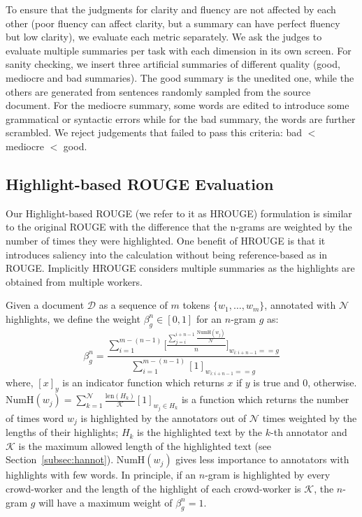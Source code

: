 \documentclass[11pt,a4paper]{article}
\newcommand\hrouge{\textsc{HROUGE}}
\newcommand\rouge{\textsc{ROUGE}}
\begin{document}
To ensure that the judgments for clarity and fluency are not affected by each other (poor fluency can affect clarity, but a summary can have perfect fluency but low clarity), we evaluate each metric separately. We ask the judges to evaluate multiple summaries per task with each dimension in its own screen. For sanity checking, we insert three artificial summaries of different quality (good, mediocre and bad summaries). The good summary is the unedited one, while the others are generated from sentences randomly sampled from the source document. For the mediocre summary, some words are edited to introduce some grammatical or syntactic errors while for the bad summary, the words are further scrambled. We reject judgements that failed to pass this criteria: bad $<$ mediocre $<$ good.

\subsection{Highlight-based ROUGE Evaluation} 
\label{subsec:hrouge}

Our Highlight-based \rouge{} (we refer to it as \hrouge{}) formulation is similar to the original ROUGE with the difference that the n-grams are weighted by the number of times they were highlighted. One benefit of \hrouge{} is that it introduces saliency into the calculation without being reference-based as in \rouge{}. Implicitly \hrouge{} considers multiple summaries as the highlights are obtained from multiple workers. 

Given a document $\mathcal{D}$ as a sequence of $m$ tokens $\{w_1, \ldots, w_m\}$, annotated with $\mathcal{N}$ highlights, we define the weight $\beta_g^n \in [0,1]$ for an $n$-gram $g$ as: 
\begin{equation}
    \beta_g^n = \frac{\displaystyle\sum_{i=1}^{m-(n-1)} \Bigg[\frac{\sum_{j=i}^{i+n-1} \frac{\mathrm{NumH}(w_j)}{\mathcal{N}}}{n}\Bigg]_{w_{i:i+n-1} == g}}{\displaystyle\sum_{i=1}^{m-(n-1)} [1]_{w_{i:i+n-1} == g} }
\end{equation}
\noindent where, $[x]_y$ is an indicator function which returns $x$ if $y$ is true and $0$, otherwise.  $\mathrm{NumH}(w_j) = \sum_{k=1}^{\mathcal{N}} \frac{\mathrm{len}(H_k)}{\mathcal{K}} [1]_{w_j \in H_k}$ is a function which returns the number of times word $w_j$ is highlighted by the annotators out of $\mathcal{N}$ times weighted by the lengths of their highlights; $H_k$ is the highlighted text by the $k$-th annotator and  $\mathcal{K}$ is the maximum allowed length of the highlighted text (see Section~\ref{subsec:hannot}). $\mathrm{NumH}(w_j)$ gives less importance to  annotators with highlights with few words. In principle, if an $n$-gram is highlighted by every crowd-worker and the length of the highlight of each crowd-worker is $\mathcal{K}$, the $n$-gram $g$ will have a maximum weight of $\beta_g^n = 1$.
\end{document}
